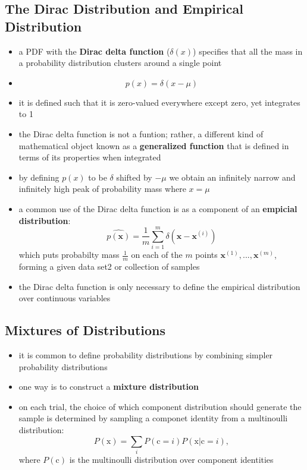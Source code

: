 \documentclass[11pt, twocolumn]{report}
\begin{document}
\subsection{The Dirac Distribution and Empirical Distribution}
\begin{itemize}
  \item a PDF with the \textbf{Dirac delta function} ($\delta(x)$) specifies
    that all the mass in a probability distribution clusters around a single
    point
  \item
    \begin{equation}
      p(x) = \delta(x - \mu)
    \end{equation}
  \item it is defined such that it is zero-valued everywhere except zero, yet
    integrates to 1
  \item the Dirac delta function is not a funtion; rather, a different kind of
    mathematical object known as a \textbf{generalized function} that is
    defined in terms of its properties when integrated
  \item by defining $p(x)$ to be $\delta$ shifted by $-\mu$ we obtain an
    infinitely narrow and infinitely high peak of probability mass where $x =
    \mu$
  \item a common use of the Dirac delta function is as a component of an
    \textbf{empicial distribution}:
    \begin{equation}
      \hat{p(\bm{x})} = \frac{1}{m} \sum_{i=1}^m \delta (\bm{x} - \bm{x}^{(i)})
    \end{equation}
    which puts probabilty mass $\frac{1}{m}$ on each of the $m$ points
    $\bm{x}^{(1)},...,\bm{x}^{(m)}$, forming a given data set2 or collection of
    samples
  \item the Dirac delta function is only necessary to define the empirical
    distribution over continuous variables
\end{itemize}

\subsection{Mixtures of Distributions}
\begin{itemize}
  \item it is common to define probability distributions by combining simpler
    probability distributions
  \item one way is to construct a \textbf{mixture distribution}
  \item on each trial, the choice of which component distribution should
    generate the sample is determined by sampling a componet identity from a
    multinoulli distribution:
    \begin{equation}
      P(\text{x}) = \sum_i P(\text{c} = i)P(\text{x} | \text{c} = i),
    \end{equation}
    where $P(\text{c})$ is the multinoulli distribution over component
    identities
\end{itemize}
\end{document}
